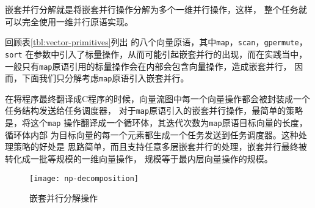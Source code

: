 嵌套并行分解就是将嵌套并行操作分解为多个一维并行操作，这样，
整个任务就可以完全使用一维并行原语实现。

回顾表\ref{tbl:vector-primitives}列出
的八个向量原语，其中\texttt{map}，\texttt{scan}，\texttt{gpermute}，\texttt{sort}
在参数中引入了标量操作，从而可能引起嵌套并行的出现，而在实践当中，
一般只有\texttt{map}原语引用的标量操作会在内部会包含向量操作，造成嵌套并行，
因而，下面我们只分解考虑\texttt{map}原语引入嵌套并行。

在将程序最终翻译成C程序的时候，向量流图中每一个向量操作都会被封装成一个任务结构发送给任务调度器，
对于\texttt{map}原语引入的嵌套并行操作，最简单的策略是，将这个\texttt{map}
操作翻译成一个循环体，其迭代次数为\texttt{map}原语目标向量的长度，循环体内部
为目标向量的每一个元素都生成一个任务发送到任务调度器。这种处理策略的好处是
思路简单，而且支持任意多层嵌套并行的处理，嵌套并行最终被转化成一批等规模的一维向量操作，
规模等于最内层向量操作的规模。

\begin{quotation}
\end{quotation}
\begin{figure}
  \centering
  \texttt{[image: np-decomposition]}
  \caption{嵌套并行分解操作}
  \label{fig:np-decomposition}
\end{figure}

